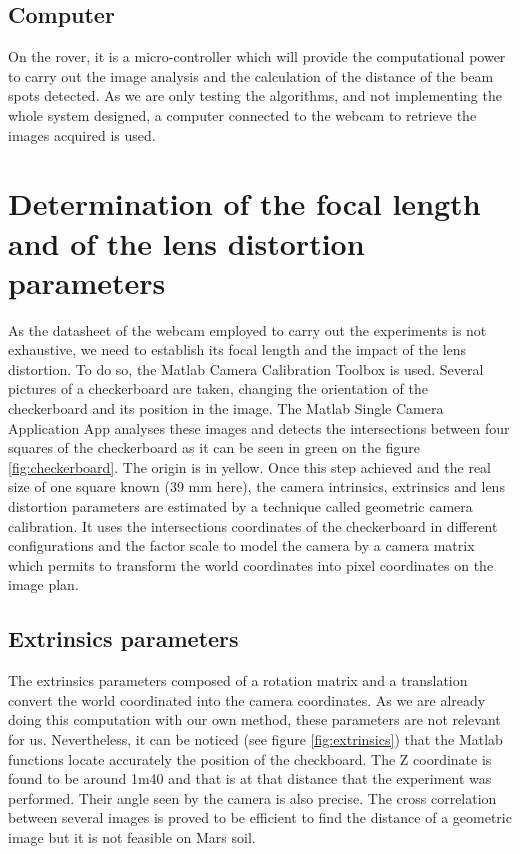 \subsection{Computer}
On the rover, it is a micro-controller which will provide the computational power to carry out the image analysis and the calculation of the distance of the beam spots detected. As we are only testing the algorithms, and not implementing the whole system designed, a computer connected to the webcam to retrieve the images acquired is used. 

\section{Determination of the focal length and of the lens distortion parameters}
As the datasheet of the webcam employed to carry out the experiments is not exhaustive, we need to establish its focal length and the impact of the lens distortion. To do so, the Matlab Camera Calibration Toolbox \cite{matlabtoolbox} is used. Several pictures of a checkerboard are taken, changing the orientation of the checkerboard and its position in the image. The Matlab Single Camera Application App analyses these images and detects the intersections between four squares of the checkerboard as it can be seen in green on the figure \ref{fig:checkerboard}. The origin is in yellow. Once this step achieved and the real size of one square known (39 mm here), the camera intrinsics, extrinsics and lens distortion parameters are estimated by a technique called geometric camera calibration. It uses the intersections coordinates of the checkerboard in different configurations and the factor scale to model the camera by a camera matrix which permits to transform the world coordinates into pixel coordinates on the image plan.

\subsection{Extrinsics parameters}
The extrinsics parameters composed of a rotation matrix and a translation convert the world coordinated into the camera coordinates. As we are already doing this computation with our own method, these parameters are not relevant for us. Nevertheless, it can be noticed (see figure \ref{fig:extrinsics}) that the Matlab functions locate accurately the position of the checkboard. The Z coordinate is found to be around 1m40 and that is at that distance that the experiment was performed. Their angle seen by the camera is also precise. The cross correlation between several images is proved to be efficient to find the distance of a geometric image but it is not feasible on Mars soil.


